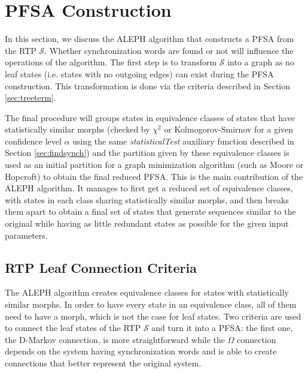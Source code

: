{\newpage

\section{PFSA Construction \label{sec:pfsacons}}

In this section, we discuss the ALEPH algorithm that constructs a PFSA from the RTP $\mathcal{S}$. Whether synchronization words are found or not will influence the operations of the algorithm. The first step is to transform $\mathcal{S}$ into a graph as no leaf states (i.e. states with no outgoing edges) can exist during the PFSA construction. This transformation is done via the criteria described in Section \ref{sec:treeterm}.

 The final procedure will groups states in equivalence classes of states that have statistically similar morphs (checked by $\chi^2$ or Kolmogorov-Smirnov for a given confidence level $\alpha$ using the same \textit{statisticalTest} auxiliary function described in Section \ref{sec:findsynch}) and the partition given by these equivalence classes is used as an initial partition for a graph minimization algorithm (such as Moore or Hopcroft) to obtain the final reduced PFSA. This is the main contribution of the ALEPH algorithm. It manages to first get a reduced set of equivalence classes, with states in each class sharing statistically similar morphs, and then breaks them apart to obtain a final set of states that generate sequences similar to the original while having as little redundant states as possible for the given input parameters.

\subsection{RTP Leaf Connection Criteria\label{sec:treeterm}}

The ALEPH algorithm creates equivalence classes for states with statistically similar morphs. In order to have every state in an equivalence class, all of them need to have a morph, which is not the case for leaf states. Two criteria are used to connect the leaf states of the RTP $\mathcal{S}$ and turn it into a PFSA: the first one, the D-Markov connection, is more straightforward while the $\Omega$ connection depends on the system having synchronization words and is able to create connections that better represent the original system.

}
